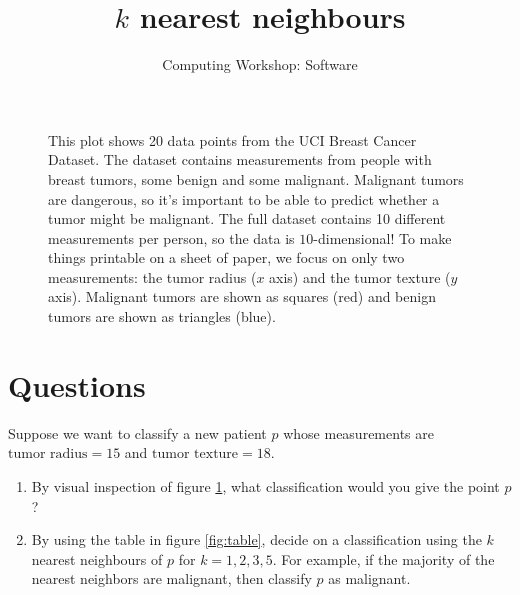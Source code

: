 \documentclass[11pt]{article}
\title{$k$ nearest neighbours}
\author{Computing Workshop: Software}
\begin{document}
\maketitle

\begin{figure}[H]
  \centering
  \caption{%
    This plot shows 20 data points from the UCI Breast Cancer Dataset.
    The dataset contains measurements from people with breast tumors, some
    benign and some malignant. Malignant tumors are dangerous, so it's important
    to be able to predict whether a tumor might be malignant.
    The full dataset contains 10 different measurements per person, so the data
    is $10$-dimensional! To make things printable on a sheet of paper, we focus
    on only two measurements: the tumor radius ($x$ axis) and the tumor texture
    ($y$ axis).%
    Malignant tumors are shown as squares (red) and benign tumors are shown as
    triangles (blue).
  }
  \label{fig:chart}
\end{figure}

\newpage

\section*{Questions}

Suppose we want to classify a new patient $p$ whose measurements are
$\text{tumor radius} = 15$ and $\text{tumor texture} = 18$.

\begin{enumerate}
\item
  By visual inspection of figure \ref{fig:chart}, what classification would you
  give the point $p$?
  \vspace{2em}
\item
  By using the table in figure \ref{fig:table}, decide on a classification using
  the $k$ nearest neighbours of $p$ for $k=1,2,3,5$. For example, if the majority
  of the nearest neighbors are malignant, then classify $p$ as malignant.
  \vspace{2em}
\end{enumerate}
\end{document}
